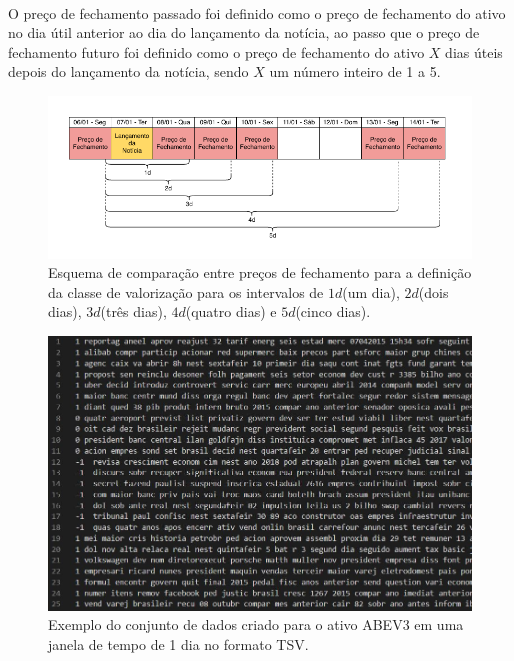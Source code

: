 \documentclass[grad,numbers]{coppe}
\begin{document}
  		\paragraph{}O preço de fechamento passado foi definido como o preço de fechamento do ativo no dia útil anterior ao dia do lançamento da notícia, ao passo que o preço de fechamento futuro foi definido como o preço de fechamento do ativo $X$ dias úteis depois do lançamento da notícia, sendo $X$ um número inteiro de 1 a 5.
  		\begin{figure}[h]
  			\centering
  			{\includegraphics[width=16cm]{calendar-example.pdf}
	 				\caption{Esquema de comparação entre preços de fechamento para a definição da classe de valorização para os intervalos de $1d$(um dia), $2d$(dois dias), $3d$(três dias), $4d$(quatro dias) e $5d$(cinco dias).}
	 				\label{fig:calendar-example-fig}}
  		\end{figure}
  		\begin{figure}[h]
  			\centering
  			{\includegraphics[width=14cm]{abev3_dataset_example}
  				\caption{Exemplo do conjunto de dados criado para o ativo ABEV3 em uma janela de tempo de 1 dia no formato TSV.}
  				\label{fig:abev3_dataset_example-fig}}
  		\end{figure}
\end{document}
